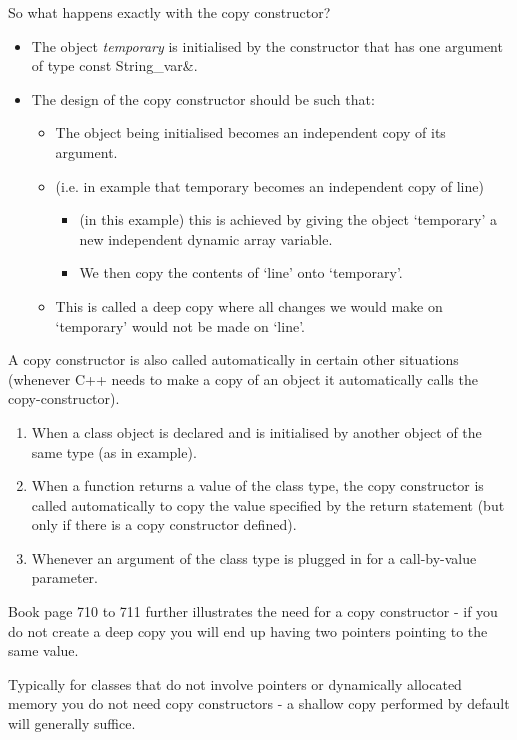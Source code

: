 So what happens exactly with the copy constructor?
\begin{itemize}
	\item The object \emph{temporary} is initialised by the constructor that has one
	argument of type const String\_var\&.
	\item The design of the copy constructor should be such that:
	\begin{itemize}
		\item The object being initialised becomes an independent copy of its argument. 
		\item (i.e. in example that temporary becomes an independent copy of line)
		\begin{itemize}
			\item (in this example) this is achieved by giving the object `temporary' a new
			independent dynamic array variable.
			\item We then copy the contents of `line' onto `temporary'.
		\end{itemize}
		\item This is called a deep copy where all changes we would make on `temporary'
		would not be made on `line'.
	\end{itemize}
\end{itemize}

A copy constructor is also called automatically in certain other situations (whenever C++ needs
to make a copy of an object it automatically calls the copy-constructor).
\begin{enumerate}
	\item When a class object is declared and is initialised by another object of the same type
	(as in example).
	\item When a function returns a value of the class type, the copy constructor is called
	automatically to copy the value specified by the return statement (but only if there is a
	copy constructor defined).
	\item Whenever an argument of the class type is plugged in for a call-by-value parameter.
\end{enumerate}

Book page 710 to 711 further illustrates the need for a copy constructor - if you do not create a
deep copy you will end up having two pointers pointing to the same value.

Typically for classes that do not involve pointers or dynamically allocated memory you do not
need copy constructors - a shallow copy performed by default will generally suffice.


